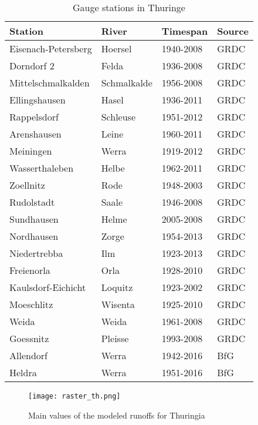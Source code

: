 \begin{table}[H]
\footnotesize
 \centering
 \caption{Gauge stations in Thuringe}
 \label{quelle_runoff_th}
 \begin{tabular}{|l|l|l|l|}
  \hline
  \textbf{Station}&\textbf{River}&\textbf{Timespan}&\textbf{Source}\\
  \hline
  Eisenach-Petersberg&Hoersel&1940-2008&GRDC\\
  Dorndorf 2&Felda&1936-2008&GRDC\\
  Mittelschmalkalden&Schmalkalde&1956-2008&GRDC\\
  Ellingshausen&Hasel&1936-2011&GRDC\\
  Rappelsdorf&Schleuse&1951-2012&GRDC\\
  Arenshausen&Leine&1960-2011&GRDC\\
  Meiningen&Werra&1919-2012&GRDC\\
  Wasserthaleben&Helbe&1962-2011&GRDC\\
  Zoellnitz&Rode&1948-2003&GRDC\\
  Rudolstadt&Saale&1946-2008&GRDC\\
  Sundhausen&Helme&2005-2008&GRDC\\
  Nordhausen&Zorge&1954-2013&GRDC\\
  Niedertrebba&Ilm&1923-2013&GRDC\\
  Freienorla&Orla&1928-2010&GRDC\\
  Kaulsdorf-Eichicht&Loquitz&1923-2002&GRDC\\
  Moeschlitz&Wisenta&1925-2010&GRDC\\
  Weida&Weida&1961-2008&GRDC\\
  Goessnitz&Pleisse&1993-2008&GRDC\\
  Allendorf&Werra&1942-2016&BfG\\
  Heldra&Werra&1951-2016&BfG\\
  \hline
 \end{tabular}
\end{table}



\begin{figure}[H]
\centering
\texttt{[image: raster\_th.png]}
\caption{Main values of the modeled runoffs for Thuringia}
\label{raster_th}
\end{figure}